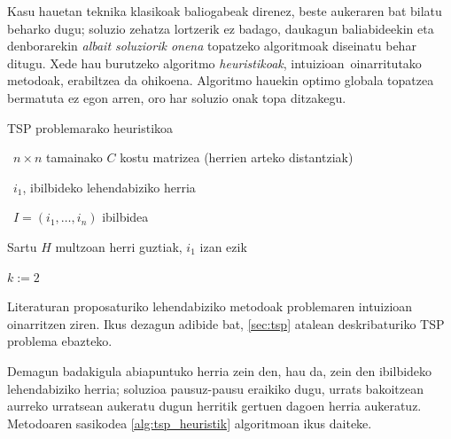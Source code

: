 \documentclass[eu]{ifirak}\usepackage[]{graphicx}\usepackage[]{color}
\newcommand{\zkk}{\guillemotleft}
\newcommand{\skk}{\guillemotright}
\begin{document}
Kasu hauetan teknika klasikoak baliogabeak direnez, beste aukeraren bat bilatu beharko dugu; soluzio zehatza lortzerik ez badago, daukagun baliabideekin eta denborarekin \textit{albait soluziorik onena} topatzeko algoritmoak diseinatu behar ditugu. Xede hau burutzeko algoritmo \textit{heuristikoak}, \zkk intuizioan\skk\ oinarritutako metodoak, erabiltzea da ohikoena. Algoritmo hauekin optimo globala topatzea bermatuta ez egon arren, oro har soluzio onak topa ditzakegu.


\begin{ifalgorithm}[t]
\begin{ifpseudo}{TSP problemarako heuristikoa}
\item \In\ $n \times n$ tamainako $C$ kostu matrizea (herrien arteko distantziak)
\item \In\ $i_1$, ibilbideko lehendabiziko herria
\item \Out\ $I=(i_1, \ldots, i_n)$ ibilbidea
\item Sartu $H$ multzoan herri guztiak, $i_1$ izan ezik
\item $k:=2$
\item {}
\item {}
\item {}
\item \Done
\end{ifpseudo}
\caption{TSPrako soluzio onak eraikitzeko metodo heuristikoa}\label{alg:tsp_heuristik}
\end{ifalgorithm}


Literaturan proposaturiko lehendabiziko metodoak problemaren intuizioan oinarritzen ziren. Ikus dezagun adibide bat, \ref{sec:tsp} atalean deskribaturiko TSP problema ebazteko. 

Demagun badakigula abiapuntuko herria zein den, hau da, zein den ibilbideko lehendabiziko herria; soluzioa pausuz-pausu eraikiko dugu, urrats bakoitzean aurreko urratsean aukeratu dugun herritik gertuen dagoen herria aukeratuz. Metodoaren sasikodea \ref{alg:tsp_heuristik} algoritmoan ikus daiteke.
\end{document}
